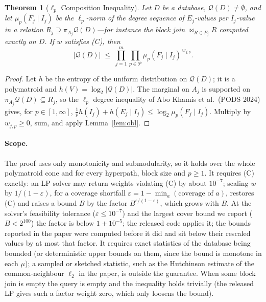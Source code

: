 \documentclass[11pt]{article}
\newcommand{\query}{\mathcal{Q}}
\newcommand{\block}{F}
\newcommand{\interface}{I}
\newcommand{\muLp}[3]{\mu_{#1}(#2 \mid #3)}
\newtheorem{theorem}{Theorem}
\begin{document}
\begin{theorem}[$\ell_p$ Composition Inequality]
Let $D$ be a database, $\query(D)\ne\emptyset$, and let
$\muLp{p}{\block_j}{\interface_j}$ be the $\ell_p$-norm of the degree
sequence of $E_j$-values per $\interface_j$-value in a relation
$R_j\supseteq\pi_{A_j}\query(D)$---for instance the block join
$\bowtie_{R\in\block_j}R$ computed exactly on $D$. If $w$ satisfies (C), then
\[
|\query(D)|\;\le\;\prod_{j=1}^m\prod_{p\in\mathcal P}
\muLp{p}{\block_j}{\interface_j}^{\,w_{j,p}}.
\]
\end{theorem}
\begin{proof}
Let $h$ be the entropy of the uniform distribution on $\query(D)$; it is a
polymatroid and $h(V)=\log_2|\query(D)|$. The marginal on $A_j$ is
supported on $\pi_{A_j}\query(D)\subseteq R_j$, so the $\ell_p$ degree
inequality of Abo Khamis et al.\ (PODS 2024) gives, for $p\in[1,\infty]$,
$\frac1p h(\interface_j)+h(E_j\mid\interface_j)\le
\log_2\muLp{p}{\block_j}{\interface_j}$. Multiply by $w_{j,p}\ge0$, sum, and
apply Lemma~\ref{lem:obl}.
\end{proof}

\paragraph{Scope.} The proof uses only monotonicity and submodularity, so
it holds over the whole polymatroid cone and for every hyperpath, block
size and $p\ge1$. It requires (C) exactly: an LP solver may return weights
violating (C) by about $10^{-7}$; scaling $w$ by
$1/(1-\varepsilon)$, for a coverage shortfall $\varepsilon=1-\min_a(\text{coverage of }a)$,
restores (C) and raises a bound $B$ by the factor $B^{\varepsilon/(1-\varepsilon)}$, which grows
with $B$. At the solver's feasibility tolerance ($\varepsilon\le10^{-7}$) and the largest
cover bound we report ($B<2^{100}$) the factor is below $1+10^{-5}$; the released
code applies it; the bounds reported in the paper were computed before it did
and sit below their rescaled values by at most that factor. It requires exact statistics of the
database being bounded (or deterministic upper bounds on them, since the
bound is monotone in each $\mu$); a sampled or sketched statistic, such as
the Hutchinson estimate of the common-neighbour $\ell_2$ in the paper, is
outside the guarantee. When some block join is empty the query is empty
and the inequality holds trivially (the released LP gives such a factor
weight zero, which only loosens the bound).
\end{document}
